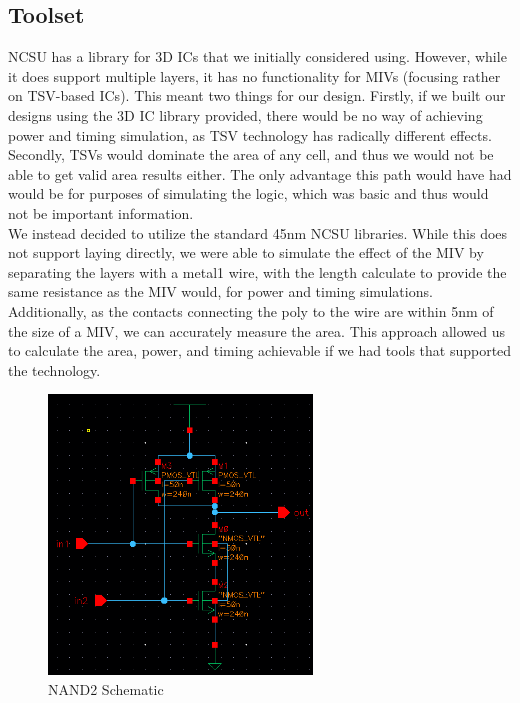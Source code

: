 \documentclass{article}
\begin{document}
\subsection{Toolset} NCSU has a library for 3D ICs that we initially considered using. However, while it does support multiple layers, it has no functionality for MIVs (focusing rather on TSV-based ICs). This meant two things for our design. Firstly, if we built our designs using the 3D IC library provided, there would be no way of achieving power and timing simulation, as TSV technology has radically different effects. Secondly, TSVs would dominate the area of any cell, and thus we would not be able to get valid area results either. The only advantage this path would have had would be for purposes of simulating the logic, which was basic and thus would not be important information. \\ 
We instead decided to utilize the standard 45nm NCSU libraries. While this does not support laying directly, we were able to simulate the effect of the MIV by separating the layers with a metal1 wire, with the length calculate to provide the same resistance as the MIV would, for power and timing simulations. Additionally, as the contacts connecting the poly to the wire are within 5nm of the size of a MIV, we can accurately measure the area. This approach allowed us to calculate the area, power, and timing achievable if we had tools that supported the technology. 
	\begin{figure}[t]
		\centering
		\includegraphics[width=7cm]{step1}
  		\caption{NAND2 Schematic}
		\label{step1}
	\end{figure}		
\end{document}

